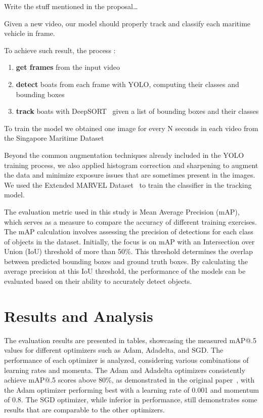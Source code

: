 \documentclass[a4paper,12pt]{article}
\begin{document}
\begin{multicols}{2}
\hfill\newline
Write the stuff mentioned in the proposal\ldots %
\hfill\newline

Given a new video, our model should properly track and classify each maritime vehicle in frame.

To achieve such result, the process :
\begin{enumerate}
    \item \textbf{get frames} from the input video
    \item \textbf{detect} boats from each frame with YOLO, computing their classes and bounding boxes
    \item \textbf{track} boats with DeepSORT~\cite{DEEPSORT} given a list of bounding boxes and their classes
\end{enumerate}

To train the model we obtained one image for every N seconds in each video from the Singapore Maritime Dataset~\cite{SINGAPORE}

Beyond the common augmentation techniques already included in the YOLO training process, we also applied histogram correction and sharpening to augment the data and minimize exposure issues that are sometimes present in the images.
We used the Extended MARVEL Dataset~\cite{MARVEL} to train the classifier in the tracking model.

The evaluation metric used in this study is Mean Average Precision (mAP), which serves as a measure to compare the accuracy of different training exercises.
The mAP calculation involves assessing the precision of detections for each class of objects in the dataset.
Initially, the focus is on mAP with an Intersection over Union (IoU) threshold of more than 50\%.
This threshold determines the overlap between predicted bounding boxes and ground truth boxes.
By calculating the average precision at this IoU threshold, the performance of the models can be evaluated based on their ability to accurately detect objects.

\section{Results and Analysis}\label{sec:results-and-analysis}

The evaluation results are presented in tables, showcasing the measured mAP@.5 values for different optimizers such as Adam, Adadelta, and SGD. The performance of each optimizer is analyzed, considering various combinations of learning rates and momenta.
The Adam and Adadelta optimizers consistently achieve mAP@.5 scores above 80\%, as demonstrated in the original paper~\cite{MVDTHME}, with the Adam optimizer performing best with a learning rate of 0.001 and momentum of 0.8. The SGD optimizer, while inferior in performance, still demonstrates some results that are comparable to the other optimizers.


\end{multicols}
\end{document}
